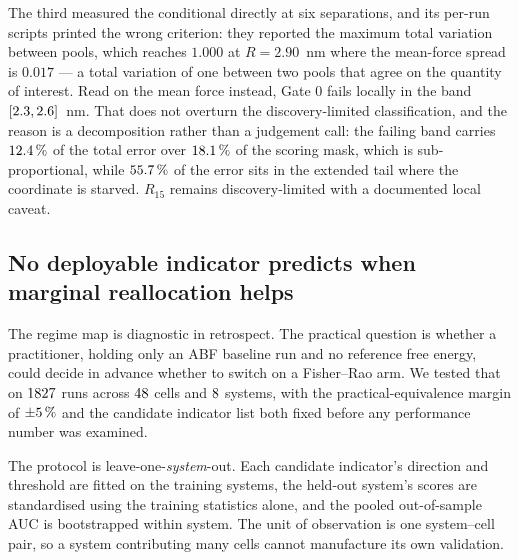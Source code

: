 The third measured the conditional directly at six separations, and its per-run scripts printed
the wrong criterion: they reported the maximum total variation between pools, which reaches
$1.000$ at $R = 2.90$~nm where the mean-force spread is $0.017$ --- a total variation of one
between two pools that agree on the quantity of interest. Read on the mean force instead, Gate 0
fails locally in the band $[2.3, 2.6]$~nm. That does not overturn the
discovery-limited classification, and the reason is a decomposition rather than a judgement call:
the failing band carries $12.4\,\%$ of the total error over $18.1\,\%$ of the
scoring mask, which is sub-proportional, while $55.7\,\%$ of the error sits in the
extended tail where the coordinate is starved. $R_{15}$ remains discovery-limited with a
documented local caveat.

\subsection{No deployable indicator predicts when marginal reallocation helps}
\label{sec:mechanism_audit}

The regime map is diagnostic in retrospect. The practical question is whether a practitioner,
holding only an ABF baseline run and no reference free energy, could decide in advance whether to
switch on a Fisher--Rao arm. We tested that on $1827$ runs across $48$ cells and
$8$ systems, with the practical-equivalence margin of $\pm5\,\%$ and the
candidate indicator list both fixed before any performance number was examined.

The protocol is leave-one-\emph{system}-out. Each candidate indicator's direction and threshold
are fitted on the training systems, the held-out system's scores are standardised using the
training statistics alone, and the pooled out-of-sample AUC is bootstrapped within system. The
unit of observation is one system--cell pair, so a system contributing many cells cannot
manufacture its own validation.

